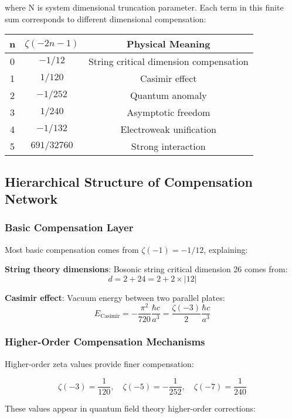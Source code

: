 \documentclass[12pt,a4paper]{article}
\begin{document}
where N is system dimensional truncation parameter. Each term in this finite sum corresponds to different dimensional compensation:

\begin{center}
\begin{tabular}{|c|c|c|}
\hline
n & $\zeta(-2n-1)$ & Physical Meaning \\
\hline
0 & $-1/12$ & String critical dimension compensation \\
1 & $1/120$ & Casimir effect \\
2 & $-1/252$ & Quantum anomaly \\
3 & $1/240$ & Asymptotic freedom \\
4 & $-1/132$ & Electroweak unification \\
5 & $691/32760$ & Strong interaction \\
\hline
\end{tabular}
\end{center}

\subsection{Hierarchical Structure of Compensation Network}

\subsubsection{Basic Compensation Layer}

Most basic compensation comes from $\zeta(-1) = -1/12$, explaining:

\textbf{String theory dimensions}:
Bosonic string critical dimension 26 comes from:
$$d = 2 + 24 = 2 + 2 \times |12|$$

\textbf{Casimir effect}:
Vacuum energy between two parallel plates:
$$E_{\text{Casimir}} = -\frac{\pi^2}{720} \frac{\hbar c}{a^3} = \frac{\zeta(-3)}{2} \frac{\hbar c}{a^3}$$

\subsubsection{Higher-Order Compensation Mechanisms}

Higher-order zeta values provide finer compensation:

$$\zeta(-3) = \frac{1}{120}, \quad \zeta(-5) = -\frac{1}{252}, \quad \zeta(-7) = \frac{1}{240}$$

These values appear in quantum field theory higher-order corrections:
\end{document}
